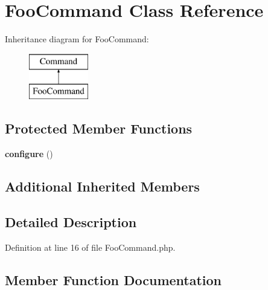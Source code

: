 \section{Foo\+Command Class Reference}
\label{class_symfony_1_1_component_1_1_http_kernel_1_1_tests_1_1_fixtures_1_1_extension_present_bundle_1_1_command_1_1_foo_command}
Inheritance diagram for Foo\+Command\+:\begin{figure}[H]
\begin{center}
\leavevmode
\includegraphics[height=2.000000cm]{class_symfony_1_1_component_1_1_http_kernel_1_1_tests_1_1_fixtures_1_1_extension_present_bundle_1_1_command_1_1_foo_command}
\end{center}
\end{figure}
\subsection*{Protected Member Functions}
\begin{DoxyCompactItemize}
\item 
{\bf configure} ()
\end{DoxyCompactItemize}
\subsection*{Additional Inherited Members}


\subsection{Detailed Description}


Definition at line 16 of file Foo\+Command.\+php.



\subsection{Member Function Documentation}
